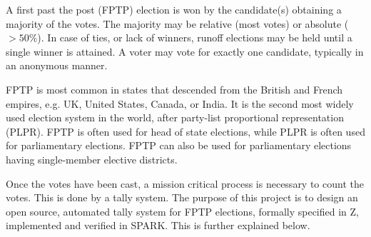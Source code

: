 \documentclass[a4paper]{article}
\begin{document}
\maketitle
\thispagestyle{first} %

A first past the post (FPTP) election is won by the candidate(s) obtaining a
majority of the votes. The majority may be relative (most votes) or absolute
($> 50\%$). In case of ties, or lack of winners, runoff elections may be held
until a single winner is attained. A voter may vote for exactly one candidate,
typically in an anonymous manner.

FPTP is most common in states that descended from the British and French
empires, e.g. UK, United States, Canada, or India. It is the second most widely
used election system in the world, after party-list proportional representation
(PLPR). FPTP is often used for head of state elections, while PLPR is often
used for parliamentary elections. FPTP can also be used for parliamentary
elections having single-member elective districts.

Once the votes have been cast, a mission critical process is necessary to count
the votes. This is done by a tally system. The purpose of this project is to
design an open source, automated tally system for FPTP elections, formally
specified in Z, implemented and verified in SPARK. This is further explained
below.








\end{document}
